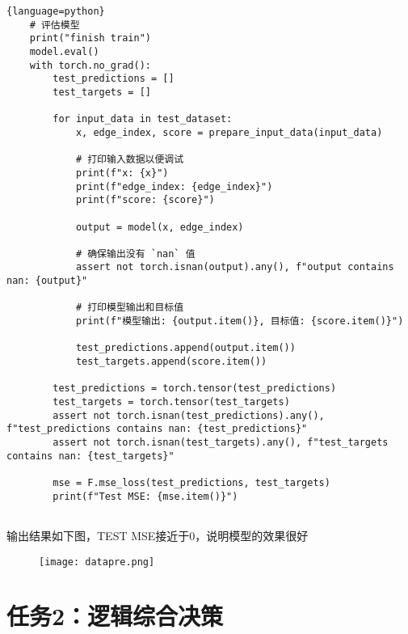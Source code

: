 \documentclass[UTF8]{ctexart}
\begin{document}
\begin{lstlisting}{language=python}
    # 评估模型
    print("finish train")
    model.eval()
    with torch.no_grad():
        test_predictions = []
        test_targets = []
    
        for input_data in test_dataset:
            x, edge_index, score = prepare_input_data(input_data)
            
            # 打印输入数据以便调试
            print(f"x: {x}")
            print(f"edge_index: {edge_index}")
            print(f"score: {score}")
            
            output = model(x, edge_index)
            
            # 确保输出没有 `nan` 值
            assert not torch.isnan(output).any(), f"output contains nan: {output}"
            
            # 打印模型输出和目标值
            print(f"模型输出: {output.item()}, 目标值: {score.item()}")
            
            test_predictions.append(output.item())
            test_targets.append(score.item())
    
        test_predictions = torch.tensor(test_predictions)
        test_targets = torch.tensor(test_targets)
        assert not torch.isnan(test_predictions).any(), f"test_predictions contains nan: {test_predictions}"
        assert not torch.isnan(test_targets).any(), f"test_targets contains nan: {test_targets}"
    
        mse = F.mse_loss(test_predictions, test_targets)
        print(f"Test MSE: {mse.item()}")
    
\end{lstlisting}
输出结果如下图，TEST MSE接近于0，说明模型的效果很好
\begin{figure}[H]
    \centering
    \texttt{[image: datapre.png]}
    
    \caption{}
    \label{fig:datapre}
\end{figure}\par



\section{任务2：逻辑综合决策}
\end{document}
